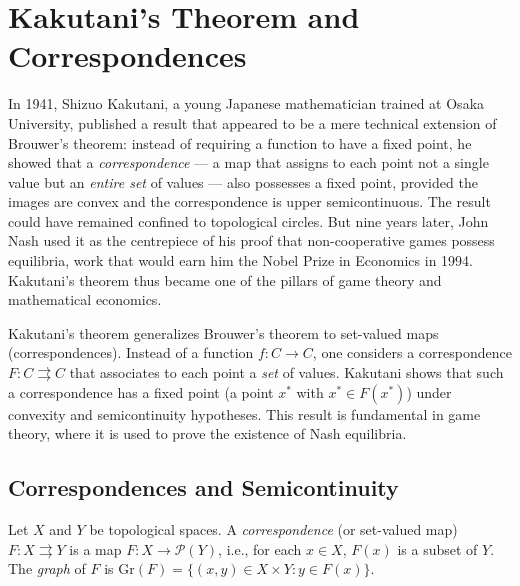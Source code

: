 \chapter{Kakutani's Theorem and Correspondences}
\label{ch:kakutani}

In 1941, Shizuo Kakutani, a young Japanese mathematician trained at Osaka University, published a result that appeared to be a mere technical extension of Brouwer's theorem: instead of requiring a function to have a fixed point, he showed that a \emph{correspondence} --- a map that assigns to each point not a single value but an \emph{entire set} of values --- also possesses a fixed point, provided the images are convex and the correspondence is upper semicontinuous. The result could have remained confined to topological circles. But nine years later, John Nash used it as the centrepiece of his proof that non-cooperative games possess equilibria, work that would earn him the Nobel Prize in Economics in 1994. Kakutani's theorem thus became one of the pillars of game theory and mathematical economics.

\begin{intuition}
Kakutani's theorem generalizes Brouwer's theorem to set-valued maps (correspondences).
Instead of a function $f\colon C \to C$, one considers a correspondence
$F\colon C \rightrightarrows C$ that associates to each point a \emph{set} of values.
Kakutani shows that such a correspondence has a fixed point (a point $x^*$ with
$x^* \in F(x^*)$) under convexity and semicontinuity hypotheses. This result is
fundamental in game theory, where it is used to prove the existence of Nash equilibria.
\end{intuition}

\section{Correspondences and Semicontinuity}

\begin{definition}
Let $X$ and $Y$ be topological spaces. A \emph{correspondence} (or set-valued map)
$F\colon X \rightrightarrows Y$ is a map $F\colon X \to \mathcal{P}(Y)$, i.e., for each
$x \in X$, $F(x)$ is a subset of $Y$. The \emph{graph} of $F$ is
$\mathrm{Gr}(F) = \{(x,y) \in X \times Y : y \in F(x)\}$.
\end{definition}

